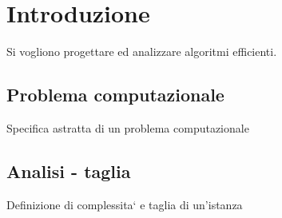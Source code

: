 \section{Introduzione}

Si vogliono progettare ed analizzare algoritmi efficienti.

\subsection{Problema computazionale}
Specifica astratta di un problema computazionale

\subsection{Analisi - taglia}
Definizione di complessita` e taglia di un'istanza


